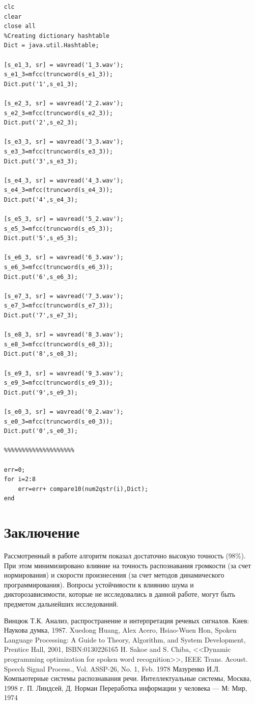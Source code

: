 \documentclass[14pt,russian,utf8,nocolumnsxix]{extarticle}
\begin{document}
\begin{lstlisting}
clc
clear
close all
%Creating dictionary hashtable
Dict = java.util.Hashtable;

[s_e1_3, sr] = wavread('1_3.wav');
s_e1_3=mfcc(truncword(s_e1_3));
Dict.put('1',s_e1_3);

[s_e2_3, sr] = wavread('2_2.wav');
s_e2_3=mfcc(truncword(s_e2_3));
Dict.put('2',s_e2_3);

[s_e3_3, sr] = wavread('3_3.wav');
s_e3_3=mfcc(truncword(s_e3_3));
Dict.put('3',s_e3_3);

[s_e4_3, sr] = wavread('4_3.wav');
s_e4_3=mfcc(truncword(s_e4_3));
Dict.put('4',s_e4_3);

[s_e5_3, sr] = wavread('5_2.wav');
s_e5_3=mfcc(truncword(s_e5_3));
Dict.put('5',s_e5_3);

[s_e6_3, sr] = wavread('6_3.wav');
s_e6_3=mfcc(truncword(s_e6_3));
Dict.put('6',s_e6_3);

[s_e7_3, sr] = wavread('7_3.wav');
s_e7_3=mfcc(truncword(s_e7_3));
Dict.put('7',s_e7_3);

[s_e8_3, sr] = wavread('8_3.wav');
s_e8_3=mfcc(truncword(s_e8_3));
Dict.put('8',s_e8_3);

[s_e9_3, sr] = wavread('9_3.wav');
s_e9_3=mfcc(truncword(s_e9_3));
Dict.put('9',s_e9_3);

[s_e0_3, sr] = wavread('0_2.wav');
s_e0_3=mfcc(truncword(s_e0_3));
Dict.put('0',s_e0_3);

%%%%%%%%%%%%%%%%%%%%

err=0;
for i=2:8
	err=err+ compare10(num2qstr(i),Dict);
end
\end{lstlisting}


\pagebreak
\section*{Заключение}

Рассмотренный в работе алгоритм показал достаточно высокую точность (98\%). При этом минимизировано влияние на точность распознавания громкости (за счет нормирования) и скорости произнесения (за счет методов динамического программирования). Вопросы устойчивости к влиянию шума и дикторозависимости, которые не исследовались в данной работе, могут быть предметом дальнейших исследований.

\pagebreak


\begin{thebibliography}{9}
	Винцюк Т.К. Анализ, распространение и интерпретация речевых сигналов. Киев: Наукова думка, 1987.
	Xuedong Huang, Alex Acero, Hsiao-Wuen Hon, Spoken Language Processing: A Guide to Theory, Algorithm, and System Development, Prentice Hall, 2001, ISBN:0130226165
	H. Sakoe and S. Chiba, <<Dynamic programming optimization for spoken word recognition>>, IEEE   Trans.  Acoust. Speech  Signal  Process.,  Vol. ASSP-26, No. 1, Feb. 1978
	 Мазуренко И.Л. Компьютерные системы распознавания речи. Интеллектуальные системы, Москва, 1998 г.
	 П. Линдсей, Д. Норман Переработка информации у человека — М: Мир, 1974
\end{thebibliography}
\end{document}
